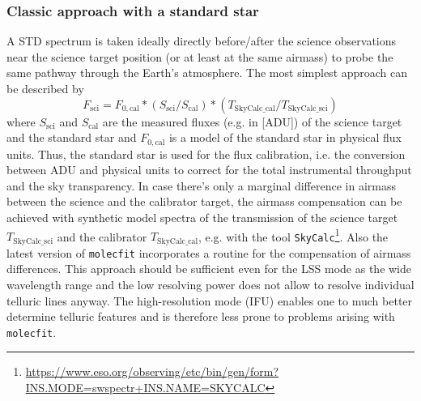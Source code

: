 \subsubsection{Classic approach with a standard star}\label{sssec:tecllcorrclassic}
A \ac{STD} spectrum is taken ideally directly before/after the science observations near the science target position (or at least at the same airmass) to probe the same pathway through the Earth's atmosphere. The most simplest approach can be described by
\begin{equation}
    F_\textrm{sci}=F_{0,\textrm{cal}}*\left(S_\textrm{sci}/S_\textrm{cal}\right)*\left(T_\textrm{SkyCalc\_cal} / T_\textrm{SkyCalc\_sci}\right)
\end{equation}
where $S_\textrm{sci}$ and $S_\textrm{cal}$ are the measured fluxes (e.g. in [\ac{ADU}]) of the science target and the standard star and $F_{0,\textrm{cal}}$ is a model of the standard star in physical flux units. Thus, the standard star is used for the flux calibration, i.e. the conversion between \ac{ADU} and physical units to correct for the total instrumental throughput and the sky transparency. In case there's only a marginal difference in airmass between the science and the calibrator target, the airmass compensation can be achieved with synthetic model spectra of the transmission of the science target $T_\textrm{SkyCalc\_sci}$ and the calibrator $T_\textrm{SkyCalc\_cal}$, e.g. with the tool \texttt{SkyCalc}\footnote{\url{https://www.eso.org/observing/etc/bin/gen/form?INS.MODE=swspectr+INS.NAME=SKYCALC}}. Also the latest version of \texttt{molecfit} incorporates a routine for the compensation of airmass differences. This approach should be sufficient even for the \ac{LSS} mode as the wide wavelength range and the low resolving power does not allow to resolve individual telluric lines anyway. The high-resolution mode (\ac{IFU}) enables one to much better determine telluric features and is therefore less prone to problems arising with \texttt{molecfit}.\\
